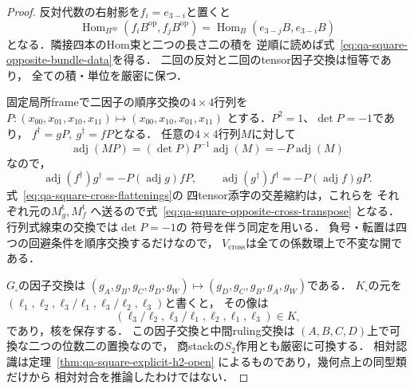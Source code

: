 \begin{proof}
反対代数の右射影を$f_i=e_{3-i}$と置くと
\[
 \operatorname{Hom}_{B^{\mathrm{op}}}(f_iB^{\mathrm{op}},
                                  f_jB^{\mathrm{op}})
 =\operatorname{Hom}_B(e_{3-j}B,e_{3-i}B)
\]
となる．隣接四本のHom束と二つの長さ二の積を
逆順に読めば式~\eqref{eq:qa-square-opposite-bundle-data}を得る．
二回の反対と二回のtensor因子交換は恒等であり，
全ての積・単位を厳密に保つ．

固定局所frameで二因子の順序交換の$4\times4$行列を
$P:(x_{00},x_{01},x_{10},x_{11})
\mapsto(x_{00},x_{10},x_{01},x_{11})$
とする．$P^2=1$、$\det P=-1$であり，
$f^\dagger=gP,\ g^\dagger=fP$となる．
任意の$4\times4$行列$M$に対して
\[
 \operatorname{adj}(MP)
   =(\det P)P^{-1}\operatorname{adj}(M)
   =-P\operatorname{adj}(M)
\]
なので，
\[
 \operatorname{adj}(f^\dagger)g^\dagger
 =-P(\operatorname{adj}g)fP,\qquad
 \operatorname{adj}(g^\dagger)f^\dagger
 =-P(\operatorname{adj}f)gP .
\]
式~\eqref{eq:qa-square-cross-flattenings}の
四tensor添字の交差縮約は，これらを
それぞれ元の$M_g^{\mathrm t},M_f^{\mathrm t}$
へ送るので式~\eqref{eq:qa-square-opposite-cross-transpose}
となる．行列式線束の交換では$\det P=-1$の
符号を伴う同定を用いる．
負号・転置は四つの回避条件を順序交換するだけなので，
$V_{\mathrm{cross}}$は全ての係数環上で不変な開である．

$G_\square$の因子交換は
$(g_A,g_B,g_C,g_D,g_W)\mapsto
(g_D,g_C,g_B,g_A,g_W)$である．
$K_\square$の元を
$(\ell_1,\ell_2,\ell_3/\ell_1,
  \ell_3/\ell_2,\ell_3)$と書くと，
その像は
\[
 (\ell_3/\ell_2,\ell_3/\ell_1,
   \ell_2,\ell_1,\ell_3)\in K_\square
\]
であり，核を保存する．
この因子交換と中間ruling交換は
$(A,B,C,D)$上で可換な二つの位数二の置換なので，
商stackの$S_2$作用とも厳密に可換する．
相対認識は定理~\ref{thm:qa-square-explicit-h2-open}
によるものであり，幾何点上の同型類だけから
相対対合を推論したわけではない．
\end{proof}

